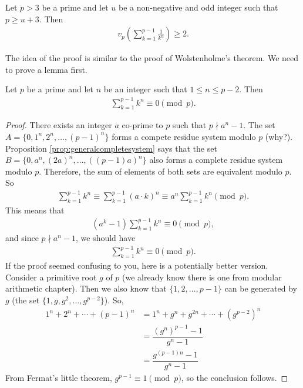\documentclass{subfile}
\begin{document}
	\begin{theorem}
		Let $p>3$ be a prime and let $u$ be a non-negative and odd integer such that $p \geq u+3$. Then
		\begin{align*}
		v_{p}\left(\sum_{k = 1}^{p - 1}\frac {1}{k^{u}}\right)\geq 2.
		\end{align*}
	\end{theorem}

	The idea of the proof is similar to the proof of Wolstenholme's theorem. We need to prove a lemma first.

	\begin{lemma}\label{lem:darijwolstproof}
		Let $p$ be a prime and let $n$ be an integer such that $1 \leq n \leq p-2$. Then
		\begin{align*}
		\sum_{k = 1}^{p - 1} k^n \equiv 0 \pmod p.
		\end{align*}
	\end{lemma}

	\begin{proof}
		There exists an integer $a$ co-prime to $p$ such that $p \nmid a^n -1$. The set $A= \{0, 1^n, 2^n, \ldots, (p-1)^n\}$ forms a compete residue system modulo $p$ (why?). Proposition \eqref{prop:generalcompletesystem} says that the set $B=\{0, a^n, (2a)^n, \ldots, ((p-1)a)^n\}$ also forms a complete residue system modulo $p$. Therefore, the sum of elements of both sets are equivalent modulo $p$. So
		\begin{align*}
		\sum_{k = 1}^{p - 1} k^n \equiv \sum_{k = 1}^{p - 1} (a \cdot k)^n \equiv a^n \sum_{k = 1}^{p - 1} k^n \pmod p.
		\end{align*}
		This means that
			\begin{align*}
				\left(a^k - 1\right) \sum_{k = 1}^{p - 1} k^n \equiv 0 \pmod p,
			\end{align*}
		and since $p \nmid a^n -1$, we should have
		\begin{align*}
		\sum_{k = 1}^{p - 1} k^n \equiv 0 \pmod p.
		\end{align*}
		If the proof seemed confusing to you, here is a potentially better version. Consider a primitive root $g$ of $p$ (we already know there is one from modular arithmetic chapter). Then we also know that $\{1,2,\ldots,p-1\}$ can be generated by $g$ (the set $\{1,g,g^2,\ldots,g^{p-2}\}$). So,
			\begin{align*}
				1^n+2^n+\cdots+(p-1)^n & = 1^n+g^n+g^{2n}+\cdots+\left(g^{p-2}\right)^n\\
										&= \dfrac{(g^n)^{p-1}-1}{g^n-1}\\
										& = \dfrac{g^{(p-1)n}-1}{g^n-1}
			\end{align*}
		From Fermat's little theorem, $g^{p-1}\equiv1\pmod p$, so the conclusion follows.
	\end{proof}
\end{document}
